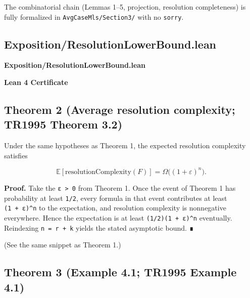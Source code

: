 \documentclass[11pt,a4paper]{article}
\begin{document}
The combinatorial chain (Lemmas 1--5, projection, resolution completeness) is fully formalized in \texttt{AvgCaseMls/Section3/} with no \texttt{sorry}.

\hypertarget{exposition-resolutionlowerbound-lean}{%
\subsection{Exposition/ResolutionLowerBound.lean}\label{exposition-resolutionlowerbound-lean}}

\noindent\textbf{Exposition/ResolutionLowerBound.lean}

\vspace{0.75\baselineskip}
\noindent\textcolor{green!40!black}{\textbf{Lean 4 Certificate}}\par\vspace{0.25\baselineskip}

\vspace{0.75\baselineskip}

\hypertarget{theorem-2-average-resolution-complexity-tr1995-theorem-3.2}{%
\subsection{Theorem 2 (Average resolution complexity; TR1995 Theorem 3.2)}\label{theorem-2-average-resolution-complexity-tr1995-theorem-3.2}}

Under the same hypotheses as Theorem 1, the expected resolution complexity satisfies

\[
\mathbb{E}[\text{resolutionComplexity}(F)] = \Omega\bigl((1 + \varepsilon)^n\bigr).
\]

\textbf{Proof.} Take the \texttt{ε\ \textgreater{}\ 0} from Theorem 1. Once the event of Theorem 1 has probability at least \texttt{1/2}, every formula in that event contributes at least \texttt{(1\ +\ ε)\^{}n} to the expectation, and resolution complexity is nonnegative everywhere. Hence the expectation is at least \texttt{(1/2)(1\ +\ ε)\^{}n} eventually. Reindexing \texttt{n\ =\ r\ +\ k} yields the stated asymptotic bound. ∎

(See the same snippet as Theorem 1.)

\hypertarget{theorem-3-example-4.1-tr1995-example-4.1}{%
\subsection{Theorem 3 (Example 4.1; TR1995 Example 4.1)}\label{theorem-3-example-4.1-tr1995-example-4.1}}
\end{document}
